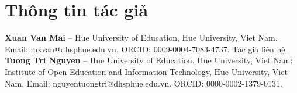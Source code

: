 \documentclass[10pt]{article}
\begin{document}



\section*{Thông tin tác giả}
\begin{sloppypar}
\textbf{Xuan Van Mai} -- Hue University of Education, Hue University, Viet Nam. Email: mxvan@dhsphue.edu.vn. ORCID: 0009-0004-7083-4737. Tác giả liên hệ.\\
\textbf{Tuong Tri Nguyen} -- Hue University of Education, Hue University, Viet Nam; Institute of Open Education and Information Technology, Hue University, Viet Nam. Email: nguyentuongtri@dhsphue.edu.vn. ORCID: 0000-0002-1379-0131.
\end{sloppypar}
\end{document}
